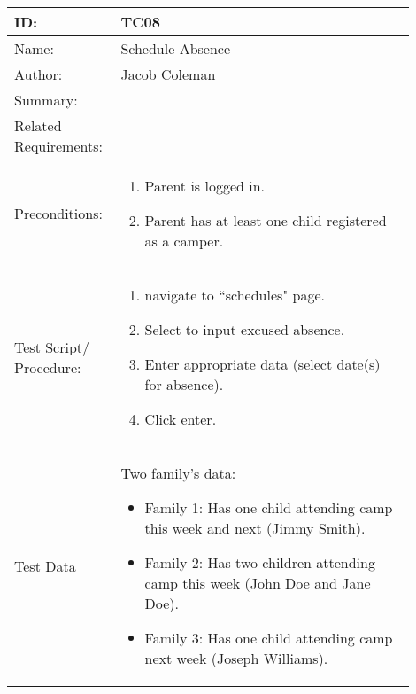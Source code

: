 \documentclass[11pt]{article}
\begin{document}
\begin{table}[H]
\begin{center}
\begin{tabular}{p{0.20\linewidth}p{0.70\linewidth}}
	ID: & TC08\\\hline
	Name: & Schedule Absence \\\hline
	Author: & Jacob Coleman\\\hline
	Summary: &  \\\hline
	Related \hspace{5em} Requirements:& \\\hline
	Preconditions:& \begin{enumerate}[topsep=0pt] 
		\item Parent is logged in.
		\item Parent has at least one child registered as a camper.
	\end{enumerate}\\\hline
	Test Script/ Procedure: & \begin{enumerate}[topsep=0pt]
	\item navigate to ``schedules" page.
	\item Select to input excused absence.
	\item Enter appropriate data (select date(s) for absence).
	\item Click enter.
	\end{enumerate}\\\hline
	Test Data & \vspace*{.25em} Two family's data:
	\begin{itemize}[topsep=0pt]
		\item Family 1: Has one child attending camp this week and next (Jimmy Smith).
		\item Family 2: Has two children attending camp this week (John Doe and Jane Doe).
		\item Family 3: Has one child attending camp next week (Joseph Williams).
	\end{itemize}
\end{tabular}
\label{des:}	
\end{center}
\end{table}
\end{document}
